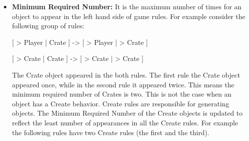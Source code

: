 \begin{itemize}
		\begin{itemize} \itemsep0pt \parskip0pt 
			\item \textbf{Move:} If an object on the left hand side has a different movement than its movement on the right hand side, this object has a Move behavior. For example, In the following rule Crate moves when Player approaches it.
			\begin{center}
				[ > Player | Crate ] -> [ > Player | > Crate ]
			\end{center}
			\item \textbf{Teleport:} An object is considered to have a Teleport behavior if its location in the rule changes from the left hand side to the right hand side. For example, In the following rule Crate changes position with Player on collision.
			\begin{center}
				[ > Player | Crate ] -> [ Crate | Player ]
			\end{center}
			\item \textbf{Create:} If the number of a certain object on the left hand side is less than its number on the right hand side, then this object has a Create behavior. For example, In the following rule, Crate is created when Player moves to an empty place.
			\begin{center}
				[ > Player | \ \ \ \ ] -> [ Crate | Player ]
			\end{center}
			\item \textbf{Destroy:} If the number of a certain object on the left hand side is greater than its number on the left hand side, then this object has a Destroy behavior. For example, In the following rule, the three Crates are destroyed when they are aligned beside each other.
			\begin{center}
				[ Crate | Crate | Crate ] -> [ \ \ \ \ | \ \ \ \ | \ \ \ \ ]
			\end{center}
		\end{itemize}
	\item \textbf{Minimum Required Number:} It is the maximum number of times for an object to appear in the left hand side of game rules. For example consider the following group of rules:
	\begin{center}
		[ > Player | Crate ] -> [ > Player | > Crate ]
	\end{center}
	\begin{center}
		[ > Crate | Crate ] -> [ > Crate | > Crate ]
	\end{center}
	The Crate object appeared in the both rules. The first rule the Crate object appeared once, while in the second rule it appeared twice. This means the minimum required number of Crates is two. This is not the case when an object has a Create behavior. Create rules are responsible for generating objects. The Minimum Required Number of the Create objects is updated to reflect the least number of appearances in all the Create rules. For example the following rules have two Create rules (the first and the third).

\end{itemize}
